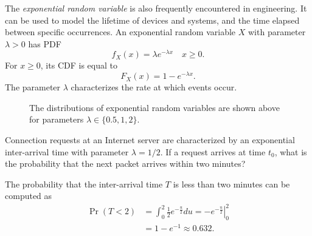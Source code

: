 The \emph{exponential random variable} is also frequently encountered in engineering. 
It can be used to model the lifetime of devices and systems, and the time elapsed between specific occurrences.
An exponential random variable $X$ with parameter $\lambda > 0$ has PDF
\begin{equation*}
f_X (x) = \lambda e^{- \lambda x} \quad x \geq 0 .
\end{equation*}
For $x \geq 0$, its CDF is equal to
\begin{equation*}
F_X (x) = 1 - e^{- \lambda x} .
\end{equation*}
The parameter $\lambda$ characterizes the rate at  which events occur.

\begin{figure}[ht]
\begin{center}
\end{center}
\caption{The distributions of exponential random variables are shown above for parameters $\lambda \in \{0.5, 1, 2 \}$.}
\end{figure}

\begin{example}
Connection requests at an Internet server are characterized by an exponential inter-arrival time with parameter $\lambda = 1/2$.
If a request arrives at time $t_0$, what is the probability that the next packet arrives within two minutes?

The probability that the inter-arrival time $T$ is less than two minutes can be computed as
\begin{equation*}
\begin{split}
\Pr ( T < 2 ) &= \int_0^2 \frac{1}{2} e^{- \frac{u}{2}} du
= \left. - e^{- \frac{u}{2}} \right|_0^2 \\
&= 1 - e^{-1} \approx 0.632 .
\end{split}
\end{equation*}
\end{example}

